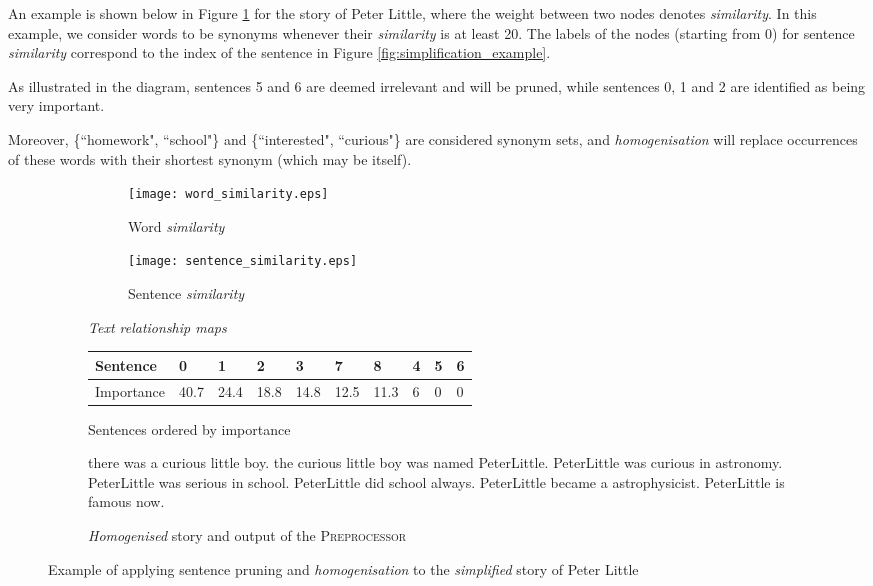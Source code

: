 An example is shown below in Figure \ref{fig:preprocessor_example} for the story of Peter Little, where the weight between two nodes denotes \textit{similarity}. In this example, we consider words to be synonyms whenever their \textit{similarity} is at least 20. The labels of the nodes (starting from 0) for sentence \textit{similarity} correspond to the index of the sentence in Figure \ref{fig:simplification_example}.

As illustrated in the diagram, sentences 5 and 6 are deemed irrelevant and will be pruned, while sentences 0, 1 and 2 are identified as being very important.

Moreover, \{``homework", ``school"\} and \{``interested", ``curious"\} are considered synonym sets, and \textit{homogenisation} will replace occurrences of these words with their shortest synonym (which may be itself).

\begin{figure}[H]
\begin{subfigure}{\textwidth}
\begin{subfigure}{0.5\textwidth}
\renewcommand\thesubfigure{\roman{subfigure}}
\texttt{[image: word\_similarity.eps]}
\caption{Word \textit{similarity}}
\end{subfigure}
\begin{subfigure}{0.5\textwidth}
\renewcommand\thesubfigure{\roman{subfigure}}
\texttt{[image: sentence\_similarity.eps]}
\caption{Sentence \textit{similarity}}
\end{subfigure}
\setcounter{subfigure}{0}
\caption{\textit{Text relationship maps}}
\end{subfigure}
\begin{subfigure}{\textwidth}
\vspace{\baselineskip}
\centering
\begin{tabular}{@{}llllllllll@{}}
\toprule
Sentence   & 0    & 1    & 2    & 3    & 7    & 8    & 4 & 5 & 6 \\ \midrule
Importance & 40.7 & 24.4 & 18.8 & 14.8 & 12.5 & 11.3 & 6 & 0 & 0 \\ \bottomrule
\end{tabular}
\caption{Sentences ordered by importance}
\end{subfigure}
\begin{subfigure}{\textwidth}
\vspace{\baselineskip}
\begin{displayquote}
there was a curious little boy. the curious little boy was named PeterLittle. PeterLittle was curious in astronomy. PeterLittle was serious in school. PeterLittle did school always. PeterLittle became a astrophysicist. PeterLittle is famous now.
\end{displayquote}
\caption{\textit{Homogenised} story and output of the \textsc{Preprocessor}}
\end{subfigure}
\caption{Example of applying sentence pruning and \textit{homogenisation} to the \textit{simplified} story of Peter Little}
\label{fig:preprocessor_example}
\end{figure}